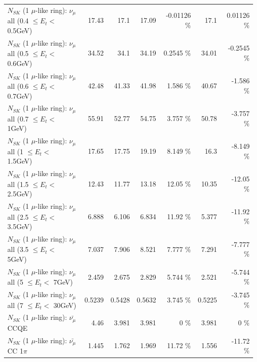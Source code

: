 \begin{table}
\begin{tabular}{| l | r | r | r  r | r  r |}
       $N_{SK}$ (1 $\mu$-like ring): $\nu_{\mu}$ all (0.4 $\leq E_{t} <$ 0.5GeV) &           17.43 &            17.1 &           17.09 & -0.01126 \%  &            17.1 &  0.01126 \%  \\ 
       $N_{SK}$ (1 $\mu$-like ring): $\nu_{\mu}$ all (0.5 $\leq E_{t} <$ 0.6GeV) &           34.52 &            34.1 &           34.19 &   0.2545 \%  &           34.01 &  -0.2545 \%  \\ 
       $N_{SK}$ (1 $\mu$-like ring): $\nu_{\mu}$ all (0.6 $\leq E_{t} <$ 0.7GeV) &           42.48 &           41.33 &           41.98 &    1.586 \%  &           40.67 &   -1.586 \%  \\ 
         $N_{SK}$ (1 $\mu$-like ring): $\nu_{\mu}$ all (0.7 $\leq E_{t} <$ 1GeV) &           55.91 &           52.77 &           54.75 &    3.757 \%  &           50.78 &   -3.757 \%  \\ 
         $N_{SK}$ (1 $\mu$-like ring): $\nu_{\mu}$ all (1 $\leq E_{t} <$ 1.5GeV) &           17.65 &           17.75 &           19.19 &    8.149 \%  &            16.3 &   -8.149 \%  \\ 
       $N_{SK}$ (1 $\mu$-like ring): $\nu_{\mu}$ all (1.5 $\leq E_{t} <$ 2.5GeV) &           12.43 &           11.77 &           13.18 &    12.05 \%  &           10.35 &   -12.05 \%  \\ 
       $N_{SK}$ (1 $\mu$-like ring): $\nu_{\mu}$ all (2.5 $\leq E_{t} <$ 3.5GeV) &           6.888 &           6.106 &           6.834 &    11.92 \%  &           5.377 &   -11.92 \%  \\ 
         $N_{SK}$ (1 $\mu$-like ring): $\nu_{\mu}$ all (3.5 $\leq E_{t} <$ 5GeV) &           7.037 &           7.906 &           8.521 &    7.777 \%  &           7.291 &   -7.777 \%  \\ 
           $N_{SK}$ (1 $\mu$-like ring): $\nu_{\mu}$ all (5 $\leq E_{t} <$ 7GeV) &           2.459 &           2.675 &           2.829 &    5.744 \%  &           2.521 &   -5.744 \%  \\ 
          $N_{SK}$ (1 $\mu$-like ring): $\nu_{\mu}$ all (7 $\leq E_{t} <$ 30GeV) &          0.5239 &          0.5428 &          0.5632 &    3.745 \%  &          0.5225 &   -3.745 \%  \\ 
\hline
\hline
\hline
                              $N_{SK}$ (1 $\mu$-like ring): $\bar{\nu_\mu}$ CCQE &            4.46 &           3.981 &           3.981 &        0 \%  &           3.981 &        0 \%  \\ 
                         $N_{SK}$ (1 $\mu$-like ring): $\bar{\nu_\mu}$ CC 1$\pi$ &           1.445 &           1.762 &           1.969 &    11.72 \%  &           1.556 &   -11.72 \%  \\ 

\end{tabular}
\end{table}
